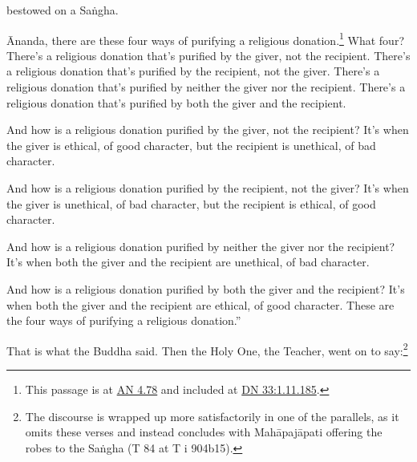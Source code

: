 \documentclass[12pt,openany]{book}%
\begin{document}
bestowed on a \textsanskrit{Saṅgha}. 

Ānanda, there are these four ways of purifying a religious donation.\footnote{This passage is at \href{https://suttacentral.net/an4.78/en/sujato}{AN 4.78} and included at \href{https://suttacentral.net/dn33/en/sujato\#1.11.185}{DN 33:1.11.185}. } What four? There’s a religious donation that’s purified by the giver, not the recipient. There’s a religious donation that’s purified by the recipient, not the giver. There’s a religious donation that’s purified by neither the giver nor the recipient. There’s a religious donation that’s purified by both the giver and the recipient. 

And how is a religious donation purified by the giver, not the recipient? It’s when the giver is ethical, of good character, but the recipient is unethical, of bad character. 

And how is a religious donation purified by the recipient, not the giver? It’s when the giver is unethical, of bad character, but the recipient is ethical, of good character. 

And how is a religious donation purified by neither the giver nor the recipient? It’s when both the giver and the recipient are unethical, of bad character. 

And how is a religious donation purified by both the giver and the recipient? It’s when both the giver and the recipient are ethical, of good character. These are the four ways of purifying a religious donation.” 

That is what the Buddha said. Then the Holy One, the Teacher, went on to say:\footnote{The discourse is wrapped up more satisfactorily in one of the parallels, as it omits these verses and instead concludes with \textsanskrit{Mahāpajāpati} offering the robes to the \textsanskrit{Saṅgha} (T 84 at T i 904b15). } 
\end{document}
